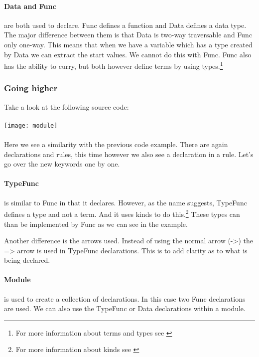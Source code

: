 \paragraph{Data and Func}
are both used to declare. Func defines a function and Data defines a data type.
The major difference between them is that Data is two-way traversable and Func only one-way.
This means that when we have a variable which has a type created by Data we can extract the start values.
We cannot do this with Func.
Func also has the ability to curry, but both however define terms by using types.\footnote{For more information about terms and types see \cite{pierce2002types}}

\subsubsection{Going higher}
Take a look at the following source code:

\paragraph{}
\texttt{[image: module]}

\paragraph{}
Here we see a similarity with the previous code example.
There are again declarations and rules, this time however we also see a declaration in a rule.
Let's go over the new keywords one by one.

\paragraph{TypeFunc}
is similar to Func in that it declares.
However, as the name suggests, TypeFunc defines a type and not a term.
And it uses kinds to do this.\footnote{For more information about kinds see \cite{pierce2002types}}
These types can than be implemented by Func as we can see in the example.

Another difference is the arrows used.
Instead of using the normal arrow (->) the => arrow is used in TypeFunc declarations.
This is to add clarity as to what is being declared.

\paragraph{Module}
is used to create a collection of declarations.
In this case two Func declarations are used.
We can also use the TypeFunc or Data declarations within a module.

